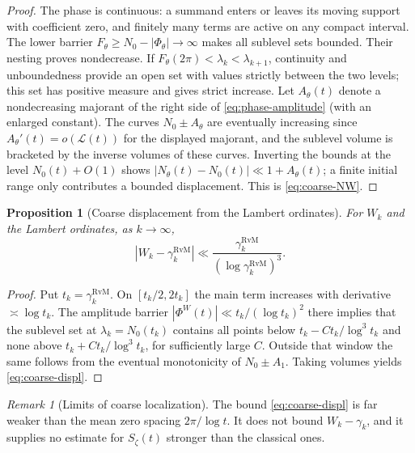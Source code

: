 \documentclass[11pt,leqno]{amsart}
\numberwithin{equation}{section}
\newtheorem{proposition}[theorem]{Proposition}
\theoremstyle{definition}
\theoremstyle{remark}
\newtheorem{remark}[theorem]{Remark}
\newcommand{\1}{\mathbf 1}
\begin{document}
\begin{proof}
The phase is continuous: a summand enters or leaves its moving support with coefficient zero, and finitely many terms are active on any compact interval. The lower barrier $F_\theta\ge N_0-|\Phi_\theta|\to\infty$ makes all sublevel sets bounded. Their nesting proves nondecrease. If $F_\theta(2\pi)<\lambda_k<\lambda_{k+1}$, continuity and unboundedness provide an open set with values strictly between the two levels; this set has positive measure and gives strict increase.
Let $A_\theta(t)$ denote a nondecreasing majorant of the right side of \eqref{eq:phase-amplitude} (with an enlarged constant). The curves $N_0\pm A_\theta$ are eventually increasing since $A_\theta'(t)=o(\mathcal L(t))$ for the displayed majorant, and the sublevel volume is bracketed by the inverse volumes of these curves. Inverting the bounds at the level $N_0(t)+O(1)$ shows $|N_\theta(t)-N_0(t)|\ll1+A_\theta(t)$; a finite initial range only contributes a bounded displacement. This is \eqref{eq:coarse-NW}.
\end{proof}
\begin{proposition}[Coarse displacement from the Lambert ordinates]\label{prop:coarse-displ}
For $W_k$ and the Lambert ordinates, as $k\to\infty$,
\begin{equation}\label{eq:coarse-displ}
 |W_k-\gamma_k^{\mathrm{RvM}}|\ll
 \frac{\gamma_k^{\mathrm{RvM}}}{(\log\gamma_k^{\mathrm{RvM}})^3}.
\end{equation}
\end{proposition}
\begin{proof}
Put $t_k=\gamma_k^{\mathrm{RvM}}$. On $[t_k/2,2t_k]$ the main term increases with derivative $\asymp\log t_k$. The amplitude barrier $|\Phi^W(t)|\ll t_k/(\log t_k)^2$ there implies that the sublevel set at $\lambda_k=N_0(t_k)$ contains all points below $t_k-Ct_k/\log^3t_k$ and none above $t_k+Ct_k/\log^3t_k$, for sufficiently large $C$. Outside that window the same follows from the eventual monotonicity of $N_0\pm A_1$. Taking volumes yields \eqref{eq:coarse-displ}.
\end{proof}
\begin{remark}[Limits of coarse localization]
The bound \eqref{eq:coarse-displ} is far weaker than the mean zero spacing $2\pi/\log t$. It does not bound $W_k-\gamma_k$, and it supplies no estimate for $S_\zeta(t)$ stronger than the classical ones.
\end{remark}
\end{document}
